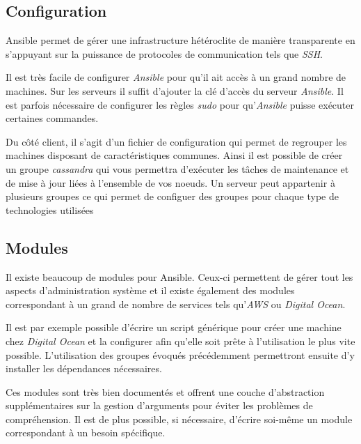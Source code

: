 \documentclass[12pt,a4paper]{article}
\begin{document}
  \newpage

  \subsection{Configuration}\label{configuration}

  \bigskip

  Ansible permet de gérer une infrastructure hétéroclite de manière
  transparente en s'appuyant sur la puissance de protocoles de
  communication tels que \emph{SSH}.

  \bigskip

  Il est très facile de configurer \emph{Ansible} pour qu'il ait accès à
  un grand nombre de machines. Sur les serveurs il suffit d'ajouter la clé
  d'accès du serveur \emph{Ansible}. Il est parfois nécessaire de
  configurer les règles \emph{sudo} pour qu'\emph{Ansible} puisse exécuter
  certaines commandes.

  \bigskip

  Du côté client, il s'agit d'un fichier de configuration qui permet de
  regrouper les machines disposant de caractéristiques communes. Ainsi il
  est possible de créer un groupe \emph{cassandra} qui vous permettra
  d'exécuter les tâches de maintenance et de mise à jour liées à
  l'ensemble de vos noeuds. Un serveur peut appartenir à plusieurs groupes
  ce qui permet de configuer des groupes pour chaque type de technologies
  utilisées

  \newpage

  \subsection{Modules}\label{modules}

  \bigskip

  Il existe beaucoup de modules pour Ansible. Ceux-ci permettent de gérer
  tout les aspects d'administration système et il existe également des
  modules correspondant à un grand de nombre de services tels
  qu'\emph{AWS} ou \emph{Digital Ocean}.

  \bigskip

  Il est par exemple possible d'écrire un script générique pour créer une
  machine chez \emph{Digital Ocean} et la configurer afin qu'elle soit
  prête à l'utilisation le plus vite possible. L'utilisation des groupes
  évoqués précédemment permettront ensuite d'y installer les dépendances
  nécessaires.

  \bigskip

  Ces modules sont très bien documentés et offrent une couche
  d'abstraction supplémentaires sur la gestion d'arguments pour éviter les
  problèmes de compréhension. Il est de plus possible, si nécessaire,
  d'écrire soi-même un module correspondant à un besoin spécifique.
\end{document}
